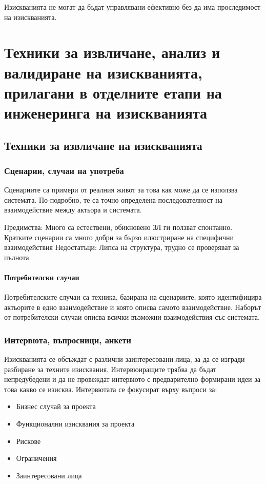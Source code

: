 \documentclass[fleqn,12pt]{article}
\begin{document}
Изискванията не могат да бъдат управлявани ефективно без да има проследимост на изискванията.

\section{Техники за извличане, анализ и валидиране на изискванията, прилагани в отделните етапи на инженеринга на изискванията}

\subsection{Техники за извличане на изискванията}

\subsubsection{Сценарии, случаи на употреба}
Сценариите са примери от реалния живот за това как може да се използва системата. По-подробно, те са точно определена последователност на взаимодействие между актьора и системата.

Предимства: Много са естествени, обикновено ЗЛ ги ползват спонтанно. Кратките сценарии са много добри за бързо илюстриране на специфични взаимодействия
Недостатъци: Липса на структура, трудно се проверяват за пълнота.

\paragraph{Потребителски случаи}
Потребителските случаи са техника, базирана на сценариите, която идентифицира актьорите в едно взаимодействие и която описва самото взаимодействие. Наборът от потребителски случаи описва всички възможни взаимодействия със системата.

\subsubsection{Интервюта, въпросници, анкети}
Изискванията се обсъждат с различни заинтересовани лица, за да се изгради разбиране за техните изисквания. Интервюиращите трябва да бъдат непредубедени и да не провеждат интервюто с предварително формирани идеи за това какво се изисква. Интервютата се фокусират върху въпроси за:
\begin{itemize}
	\item Бизнес случай за проекта
	\item Функционални изисквания за проекта
	\item Рискове
	\item Ограничения
	\item Заинтересовани лица
\end{itemize}
\end{document}
